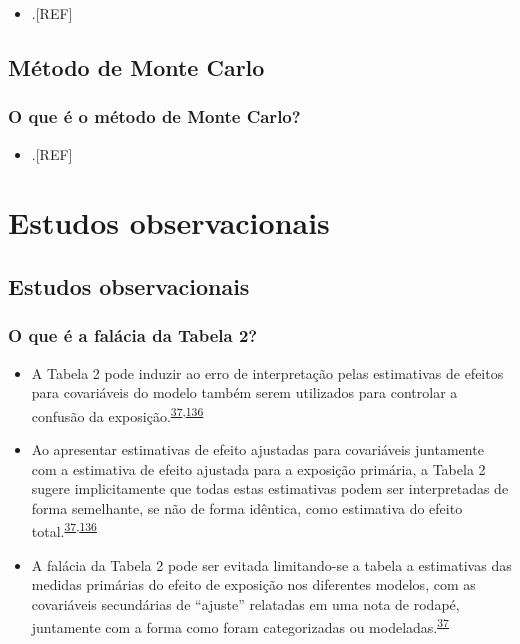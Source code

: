 \documentclass[
  a4paper,
]{book}
\providecommand{\tightlist}{%
  \setlength{\itemsep}{0pt}\setlength{\parskip}{0pt}}
\begin{document}
\begin{itemize}
\tightlist
\item
  .{[}REF{]}
\end{itemize}

\hypertarget{monte-carlo}{%
\section{Método de Monte Carlo}\label{monte-carlo}}

\hypertarget{o-que-uxe9-o-muxe9todo-de-monte-carlo}{%
\subsection{O que é o método de Monte Carlo?}\label{o-que-uxe9-o-muxe9todo-de-monte-carlo}}

\begin{itemize}
\tightlist
\item
  .{[}REF{]}
\end{itemize}

\hypertarget{estudos-observacionais}{%
\chapter{\texorpdfstring{\textbf{Estudos observacionais}}{Estudos observacionais}}\label{estudos-observacionais}}

\hypertarget{observacionais}{%
\section{Estudos observacionais}\label{observacionais}}

\hypertarget{o-que-uxe9-a-faluxe1cia-da-tabela-2}{%
\subsection{O que é a falácia da Tabela 2?}\label{o-que-uxe9-a-faluxe1cia-da-tabela-2}}

\begin{itemize}
\item
  A Tabela 2 pode induzir ao erro de interpretação pelas estimativas de efeitos para covariáveis do modelo também serem utilizados para controlar a confusão da exposição.\textsuperscript{\protect\hyperlink{ref-Westreich2013}{37},\protect\hyperlink{ref-bandoli2018}{136}}
\item
  Ao apresentar estimativas de efeito ajustadas para covariáveis juntamente com a estimativa de efeito ajustada para a exposição primária, a Tabela 2 sugere implicitamente que todas estas estimativas podem ser interpretadas de forma semelhante, se não de forma idêntica, como estimativa do efeito total.\textsuperscript{\protect\hyperlink{ref-Westreich2013}{37},\protect\hyperlink{ref-bandoli2018}{136}}
\item
  A falácia da Tabela 2 pode ser evitada limitando-se a tabela a estimativas das medidas primárias do efeito de exposição nos diferentes modelos, com as covariáveis secundárias de ``ajuste'' relatadas em uma nota de rodapé, juntamente com a forma como foram categorizadas ou modeladas.\textsuperscript{\protect\hyperlink{ref-Westreich2013}{37}}
\end{itemize}
\end{document}
